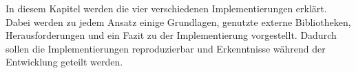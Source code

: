 In diesem Kapitel werden die vier verschiedenen Implementierungen erklärt. Dabei werden zu jedem Ansatz einige Grundlagen, genutzte externe Bibliotheken, Herausforderungen und ein Fazit zu der Implementierung vorgestellt. Dadurch sollen die Implementierungen reproduzierbar und Erkenntnisse während der Entwicklung geteilt werden.







